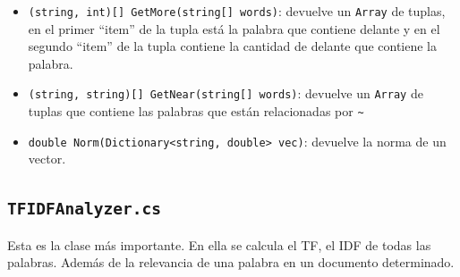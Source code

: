 \documentclass[a4paper, 12pt]{report}
\begin{document}
\begin{itemize}
	\item {\tt (string, int)[] GetMore(string[] words)}: devuelve un {\tt Array} de tuplas, en el primer ``item'' de la tupla
	      est\'a la palabra que contiene {\tt *} delante y en el segundo ``item'' de la tupla contiene la cantidad de {\tt *} delante
	      que contiene la palabra.
	\item {\tt (string, string)[] GetNear(string[] words)}: devuelve un {\tt Array} de tuplas que contiene las palabras que est\'an relacionadas por
	      {\tt \~{}}
	\item {\tt double Norm(Dictionary<string, double> vec)}: devuelve la norma de un vector.
\end{itemize}

\subsection*{\tt TFIDFAnalyzer.cs}

Esta es la clase m\'as importante. En ella se calcula el TF, el IDF de todas las
palabras. Adem\'as de la relevancia de una palabra en un documento determinado.
\end{document}
